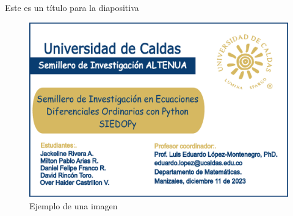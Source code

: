 \documentclass[12pt,letterpaper]{beamer}
\begin{document}
\begin{frame}{Este es un título para la diapositiva}
\begin{figure}
	\centering
	\includegraphics[scale=0.4]{images/portada.pdf}
	\caption{Ejemplo de una imagen}
\end{figure}	
\end{frame}
\end{document}
